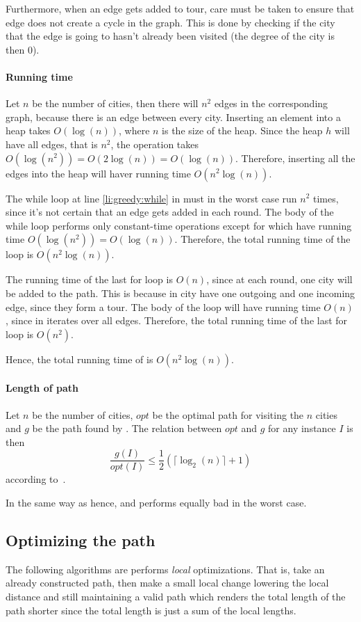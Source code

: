 Furthermore, when an edge gets added to tour, care must be taken to ensure that
edge does not create a cycle in the graph. This is done by checking if the city
that the edge is going to hasn't already been visited (the degree of the city
is then 0).

\paragraph{Running time}
Let $n$ be the number of cities, then there will $n^2$ edges in the
corresponding graph, because there is an edge between every city.
Inserting an element into a heap takes $O(\log(n))$, where $n$ is the size of
the heap. Since the heap $h$ will have all edges, that is $n^2$, the
 operation takes $O(\log(n^2)) = O(2\log(n)) = O(\log(n))$.
Therefore, inserting all the edges into the heap will haver running time
$O(n^2\log(n))$. 

The while loop at line \ref{li:greedy:while} in
 must in the worst case run $n^2$ times, since it's not certain
that an edge gets added in each round. The body of the while loop performs
only constant-time operations except for  which have
running time $O(\log(n^2)) = O(\log(n))$. Therefore, the total running time of
the loop is $O(n^2\log(n))$.

The running time of the last for loop is $O(n)$, since at each round, one city
will be added to the path. This is because in city have one outgoing and one
incoming edge, since they form a tour. The body of the loop will have running
time $O(n)$, since in iterates over all edges. Therefore,
the total running time of the last for loop is $O(n^2)$.

Hence, the total running time of  is $O(n^2\log(n))$.

\paragraph{Length of path}
Let $n$ be the number of cities, $opt$ be the optimal path for visiting the $n$
cities and $g$ be the path
found by . The relation between $opt$ and $g$ for any instance $I$ is then
\[\frac{g(I)}{opt(I)} \leq \frac{1}{2}(\lceil \log_2(n) \rceil + 1)\]
according to~\cite{johnson}. 

In the same way as  hence,  and  performs equally bad in the worst case.

\subsection{Optimizing the path}
\label{sec:optimizing_the_path}
The following algorithms are performs \emph{local} optimizations. That is, take an already constructed path,
then make a small local change lowering the local distance and still maintaining a valid path which renders the total length of the path shorter since the total length is just a sum of the local lengths.

